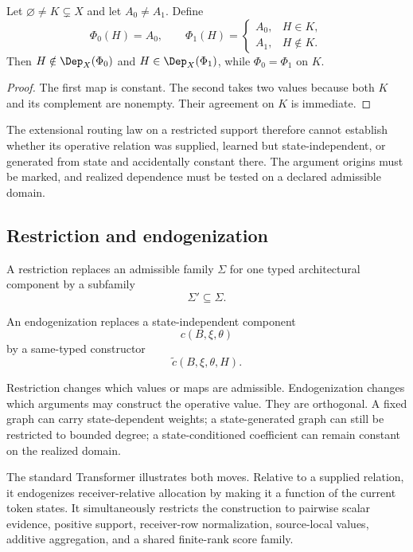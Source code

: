 \begin{proposition}\label{prop:provenance-underdetermination}
Let $\varnothing\neq K\subsetneq X$ and let $A_0\neq A_1$. Define
\[
\Phi_0(H)=A_0,
\qquad
\Phi_1(H)=
\begin{cases}
A_0,&H\in K,\\
A_1,&H\notin K.
\end{cases}
\]
Then $H\notin\Dep_X(\Phi_0)$ and $H\in\Dep_X(\Phi_1)$, while $\Phi_0=\Phi_1$ on $K$.
\end{proposition}

\begin{proof}
The first map is constant. The second takes two values because both $K$ and its complement are nonempty. Their agreement on $K$ is immediate.
\end{proof}

The extensional routing law on a restricted support therefore cannot establish whether its operative relation was supplied, learned but state-independent, or generated from state and accidentally constant there. The argument origins must be marked, and realized dependence must be tested on a declared admissible domain.

\subsection{Restriction and endogenization}

\begin{definition}[Restriction]\label{def:restriction-move}
A restriction replaces an admissible family $\Sigma$ for one typed architectural component by a subfamily
\[
\Sigma'\subseteq\Sigma.
\]
\end{definition}

\begin{definition}[Endogenization]\label{def:endogenization-move}
An endogenization replaces a state-independent component
\[
c(B,\xi,\theta)
\]
by a same-typed constructor
\[
\widetilde c(B,\xi,\theta,H).
\]
\end{definition}

Restriction changes which values or maps are admissible. Endogenization changes which arguments may construct the operative value. They are orthogonal. A fixed graph can carry state-dependent weights; a state-generated graph can still be restricted to bounded degree; a state-conditioned coefficient can remain constant on the realized domain.

The standard Transformer illustrates both moves. Relative to a supplied relation, it endogenizes receiver-relative allocation by making it a function of the current token states. It simultaneously restricts the construction to pairwise scalar evidence, positive support, receiver-row normalization, source-local values, additive aggregation, and a shared finite-rank score family.

